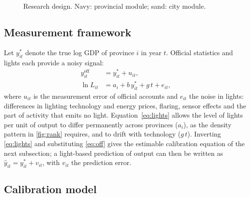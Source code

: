 \documentclass[11pt,a4paper]{article}
\begin{document}
\begin{figure}[htbp]
{}
\caption{Research design. Navy: provincial module; sand: city module.}
\label{fig:pipeline}
\end{figure}

\subsection{Measurement framework}\label{sec:framework}

Let $y^{*}_{it}$ denote the true log GDP of province $i$ in year $t$. Official statistics and lights each provide a noisy signal:
\begin{align}
y^{\text{off}}_{it} &= y^{*}_{it} + u_{it}, \label{eq:off}\\
\ln L_{it} &= a_i + b\,y^{*}_{it} + g\,t + e_{it}, \label{eq:lights}
\end{align}
where $u_{it}$ is the measurement error of official accounts and $e_{it}$ the noise in lights: differences in lighting technology and energy prices, flaring, sensor effects and the part of activity that emits no light. Equation~\eqref{eq:lights} allows the level of lights per unit of output to differ permanently across provinces ($a_i$), as the density pattern in \cref{fig:rank} requires, and to drift with technology ($g\,t$). Inverting \eqref{eq:lights} and substituting \eqref{eq:off} gives the estimable calibration equation of the next subsection; a light-based prediction of output can then be written as $\hat y_{it}=y^{*}_{it}+v_{it}$, with $v_{it}$ the prediction error.

\subsection{Calibration model}\label{sec:calibration}
\end{document}
